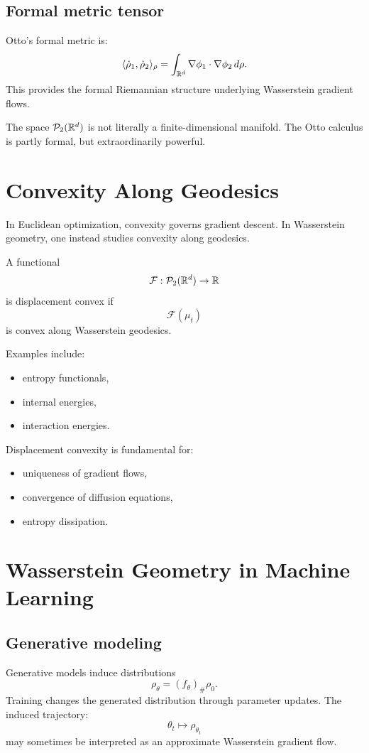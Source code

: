 \subsection{Formal metric tensor}
Otto's formal metric is:
\[
\langle \dot \rho_1,\dot \rho_2 \rangle_\rho
=
\int_{\mathbb{R}^d}
 \nabla \phi_1 \cdot \nabla \phi_2
 \, d\rho.
\]
This provides the formal Riemannian structure underlying Wasserstein gradient flows.
\begin{remark}
The space $\mathcal{P}_2(\mathbb{R}^d)$ is not literally a finite-dimensional manifold.
The Otto calculus is partly formal, but extraordinarily powerful.
\end{remark}
\section{Convexity Along Geodesics}
In Euclidean optimization, convexity governs gradient descent.
In Wasserstein geometry, one instead studies convexity along geodesics.
\begin{definition}
A functional
\[
\mathcal F : \mathcal{P}_2(\mathbb{R}^d) \to \mathbb{R}
\]
is displacement convex if
\[
\mathcal F(\mu_t)
\]
is convex along Wasserstein geodesics.
\end{definition}
Examples include:
\begin{itemize}
    \item entropy functionals,
    \item internal energies,
    \item interaction energies.
\end{itemize}
Displacement convexity is fundamental for:
\begin{itemize}
    \item uniqueness of gradient flows,
    \item convergence of diffusion equations,
    \item entropy dissipation.
\end{itemize}
\section{Wasserstein Geometry in Machine Learning}
\subsection{Generative modeling}
Generative models induce distributions
\[
\rho_\theta=(f_\theta)_\#\rho_0.
\]
Training changes the generated distribution through parameter updates.
The induced trajectory:
\[
\theta_t
\mapsto
\rho_{\theta_t}
\]
may sometimes be interpreted as an approximate Wasserstein gradient flow.
